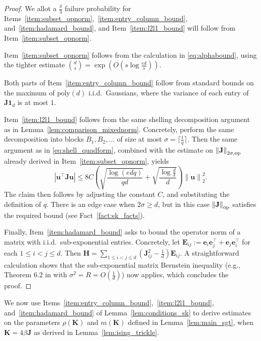 \documentclass[11pt]{article}
\newcommand{\defeq}{:=}
\newcommand{\norm}[1]{\left\lVert#1\right\rVert}
\newcommand{\normop}[1]{\left\lVert#1\right\rVert_{\textup{op}}}
\newcommand{\1}{\mathbf{1}}
\newcommand{\0}{\mathbf{0}}
\newcommand{\Par}[1]{\left(#1\right)}
\newcommand{\Abs}[1]{\left|#1\right|}
\newcommand{\poly}{\mathrm{poly}}
\newcommand{\me}{{\mathbf{E}}}
\newcommand{\mh}{{\mathbf{H}}}
\newcommand{\mj}{{\mathbf{J}}}
\newcommand{\mk}{{\mathbf{K}}}
\newcommand{\normkop}[2]{{\left\lVert#1\right\rVert_{#2, \textup{op}}}}
\newcommand{\ve}{{\mathbf{e}}}
\newcommand{\vu}{{\mathbf{u}}}
\begin{document}
\begin{proof}
We allot a $\frac \delta 3$ failure probability for Items~\ref{item:subset_opnorm},~\ref{item:entry_column_bound}, and~\ref{item:hadamard_bound}, and Item~\ref{item:l2l1_bound} will follow from Item~\ref{item:subset_opnorm}.

Item~\ref{item:subset_opnorm} follows from the  calculation in \eqref{eq:alphabound}, using the tighter estimate $\binom{d}{s} = \exp(O(s \log \frac {ed} s))$.

Both parts of Item~\ref{item:entry_column_bound} follow from standard bounds on the maximum of $\poly(d)$ i.i.d.\ Gaussians, where the variance of each entry of $\mj\1_d$ is at most $1$.

Item~\ref{item:l2l1_bound} follows from the same shelling decomposition argument as in Lemma~\ref{lem:comparison_mixednorm}. Concretely, perform the same decomposition into blocks $B_1, B_2, \ldots$ of size at most $\sigma = \lceil\frac 1 q\rceil$. Then the same argument as in \eqref{eq:shell_quadform}, combined with the estimate on $\normkop{\mj}{2\sigma}$ already derived in Item~\ref{item:subset_opnorm}, yields
\[\Abs{\vu^\top \mj \vu} \le 8C \Par{\sqrt{\frac{\log (edq)}{qd}} + \sqrt{\frac{\log \frac d \delta}{d}}}\norm{\vu}_2^2.\]
The claim then follows by adjusting the constant $C$, and substituting the definition of $q$. There is an edge case when $2\sigma \ge d$, but in this case $\normop{\mj}$ satisfies the required bound (see Fact~\ref{fact:sk_facts}).

Finally, Item~\ref{item:hadamard_bound} asks to bound the operator norm of a matrix with i.i.d.\ sub-exponential entries. Concretely, let $\me_{ij} \defeq \ve_i\ve_j^\top + \ve_j\ve_i^\top$ for each $1 \le i < j \le d$. Then $\mh = \sum_{1 \le i < j \le d} (\mj_{ij}^2 - \frac 1 d)\me_{ij}$. A straightforward calculation shows that the sub-exponential matrix Bernstein inequality (e.g., Theorem 6.2 in \cite{Tropp12} with $\sigma^2 = R = O(\frac 1 d)$) now applies, which concludes the proof.
\end{proof}

We now use Items~\ref{item:entry_column_bound},~\ref{item:l2l1_bound}, and~\ref{item:hadamard_bound} of Lemma~\ref{lem:conditions_sk} to derive estimates on the parameters $\rho(\mk)$ and $m(\mk)$ defined in Lemma~\ref{lem:main_sgt}, when $\mk = 4\beta\mj$ as derived in Lemma~\ref{lem:ising_trickle}.
\end{document}

